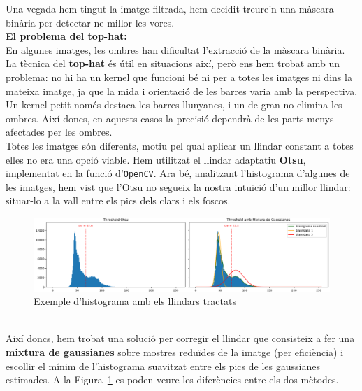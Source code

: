 \documentclass[10pt,a4paper,twocolumn,twoside]{article}
\begin{document}
Una vegada hem tingut la imatge filtrada, hem decidit treure'n una màscara binària per detectar-ne millor les vores.
\vspace*{0.5em}
\\
{\small	\textbf{El problema del top-hat:}}\vspace*{0.2em}\\
En algunes imatges, les ombres han dificultat l’extracció de la màscara binària. La tècnica del \textbf{top-hat} és útil en situacions així, però ens hem trobat amb un problema: no hi ha un kernel que funcioni bé ni per a totes les imatges ni dins la mateixa imatge, ja que la mida i orientació de les barres varia amb la perspectiva. Un kernel petit només destaca les barres llunyanes, i un de gran no elimina les ombres. Així doncs, en aquests casos la precisió dependrà de les parts menys afectades per les ombres.
\vspace*{0.5em}
\\
Totes les imatges són diferents, motiu pel qual aplicar un llindar constant a totes elles no era una opció viable. Hem utilitzat el llindar adaptatiu \textbf{Otsu}, implementat en la funció d'\texttt{OpenCV}. Ara bé, analitzant l'histograma d'algunes de les imatges, hem vist que l'Otsu no segueix la nostra intuició d'un millor llindar: situar-lo a la vall entre els pics dels clars i els foscos.
\begin{figure}[h]
	\centering
	\includegraphics[width=\linewidth]{figs/thresholds}
	\caption{Exemple d'histograma amb els llindars tractats}
	\label{fig:f}
\end{figure}
\\
Així doncs, hem trobat una solució per corregir el llindar que consisteix a fer una \textbf{mixtura de gaussianes} sobre mostres reduïdes de la imatge (per eficiència) i escollir el mínim de l’histograma suavitzat entre els pics de les gaussianes estimades. A la Figura~\ref{fig:f} es poden veure les diferències entre els dos mètodes.
\end{document}
